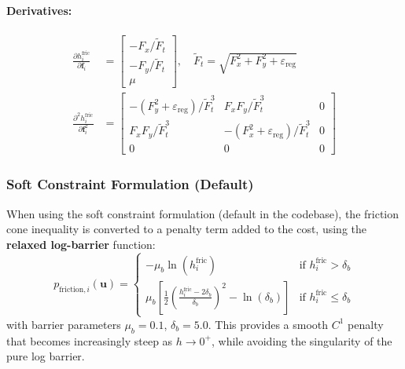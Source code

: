 \documentclass[11pt,a4paper]{article}
\begin{document}
\paragraph{Derivatives:}
\begin{align}
	\frac{\partial h_i^{\text{fric}}}{\partial \bm{f}_i}     & = \begin{bmatrix}
		                                                             -F_x / \tilde{F}_t \\
		                                                             -F_y / \tilde{F}_t \\
		                                                             \mu
	                                                             \end{bmatrix}, \quad
	\tilde{F}_t = \sqrt{F_x^2 + F_y^2 + \varepsilon_{\text{reg}}}                                                                                                                       \\[6pt]
	\frac{\partial^2 h_i^{\text{fric}}}{\partial \bm{f}_i^2} & = \begin{bmatrix}
		                                                             -(F_y^2 + \varepsilon_{\text{reg}})/\tilde{F}_t^3 & F_x F_y / \tilde{F}_t^3                           & 0 \\
		                                                             F_x F_y / \tilde{F}_t^3                           & -(F_x^2 + \varepsilon_{\text{reg}})/\tilde{F}_t^3 & 0 \\
		                                                             0                                                 & 0                                                 & 0
	                                                             \end{bmatrix}
\end{align}

\subsubsection{Soft Constraint Formulation (Default)}
\label{sec:friction_soft}

When using the soft constraint formulation (default in the codebase), the friction cone inequality is converted to a penalty term added to the cost, using the \textbf{relaxed log-barrier} function:
\begin{equation}
	p_{\text{friction},i}(\bm{u}) = \begin{cases}
		-\mu_b \ln(h_i^{\text{fric}})                                                                                 & \text{if } h_i^{\text{fric}} > \delta_b    \\
		\mu_b \left[ \frac{1}{2}\left(\frac{h_i^{\text{fric}} - 2\delta_b}{\delta_b}\right)^2 - \ln(\delta_b) \right] & \text{if } h_i^{\text{fric}} \leq \delta_b
	\end{cases}
\end{equation}
with barrier parameters $\mu_b = 0.1$, $\delta_b = 5.0$. This provides a smooth $C^1$ penalty that becomes increasingly steep as $h \to 0^+$, while avoiding the singularity of the pure log barrier.
\end{document}
